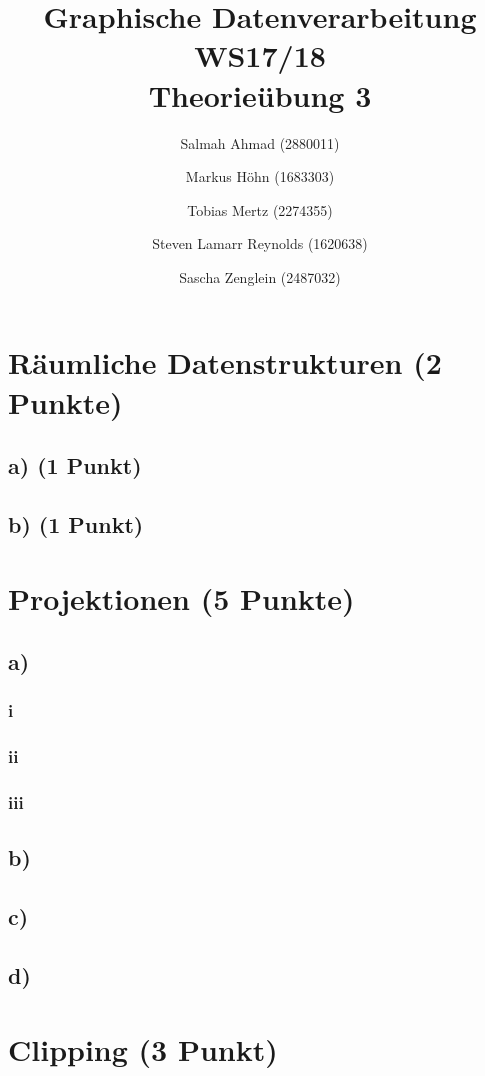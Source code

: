 \documentclass[a4paper,10pt,DIV=14]{article}
\begin{document}
\title{Graphische Datenverarbeitung WS17/18 \\ Theorieübung 3}
\author{
  Salmah Ahmad (2880011)
  \and
  Markus Höhn (1683303)
  \and
  Tobias Mertz (2274355)
  \and
  Steven Lamarr Reynolds (1620638)
  \and
  Sascha Zenglein (2487032)
}

\maketitle

\section{Räumliche Datenstrukturen (2 Punkte)}

\subsection{a) (1 Punkt)}


\subsection{b) (1 Punkt)}


\section{Projektionen (5 Punkte)}

\subsection{a)}
\subsubsection{i}
\subsubsection{ii}
\subsubsection{iii}

\subsection{b)}
\subsection{c)}
\subsection{d)}

\section{Clipping (3 Punkt)}
\end{document}
